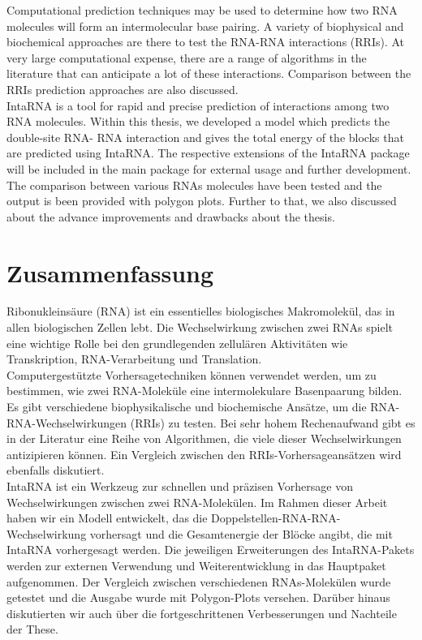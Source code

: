 \documentclass[twoside,a4paper]{report}
\begin{document}
 Computational prediction techniques may be used to determine how two RNA molecules will form an intermolecular base pairing. A variety of biophysical and biochemical approaches are there to test the RNA-RNA interactions (RRIs). At very large computational expense, there are a range of algorithms in the literature that can anticipate a lot of these interactions. Comparison between the RRIs prediction approaches are also discussed. \\

IntaRNA is a tool for rapid and precise prediction of interactions among two RNA molecules. Within this thesis, we developed a model which predicts the double-site RNA- RNA interaction and gives the total energy of the blocks that are predicted using IntaRNA. The respective extensions of the IntaRNA package will be included in the main package for external usage and further development. The comparison between various RNAs molecules have been tested and the output is been provided with polygon plots. Further to that, we also discussed about the advance improvements and drawbacks about the thesis. \\



\newpage
\chapter*{Zusammenfassung}

Ribonukleinsäure (RNA) ist ein essentielles biologisches Makromolekül, das in allen biologischen Zellen lebt. Die Wechselwirkung zwischen zwei RNAs spielt eine wichtige Rolle bei den grundlegenden zellulären Aktivitäten wie Transkription, RNA-Verarbeitung und Translation. \\

Computergestützte Vorhersagetechniken können verwendet werden, um zu bestimmen, wie zwei RNA-Moleküle eine intermolekulare Basenpaarung bilden. Es gibt verschiedene biophysikalische und biochemische Ansätze, um die RNA-RNA-Wechselwirkungen (RRIs) zu testen. Bei sehr hohem Rechenaufwand gibt es in der Literatur eine Reihe von Algorithmen, die viele dieser Wechselwirkungen antizipieren können. Ein Vergleich zwischen den RRIs-Vorhersageansätzen wird ebenfalls diskutiert. \\

IntaRNA ist ein Werkzeug zur schnellen und präzisen Vorhersage von Wechselwirkungen zwischen zwei RNA-Molekülen. Im Rahmen dieser Arbeit haben wir ein Modell entwickelt, das die Doppelstellen-RNA-RNA-Wechselwirkung vorhersagt und die Gesamtenergie der Blöcke angibt, die mit IntaRNA vorhergesagt werden. 
Die jeweiligen Erweiterungen des IntaRNA-Pakets werden zur externen Verwendung und Weiterentwicklung in das Hauptpaket aufgenommen. Der Vergleich zwischen verschiedenen RNAs-Molekülen wurde getestet und die Ausgabe wurde mit Polygon-Plots versehen. Darüber hinaus diskutierten wir auch über die fortgeschrittenen Verbesserungen und Nachteile der These.
\end{document}
